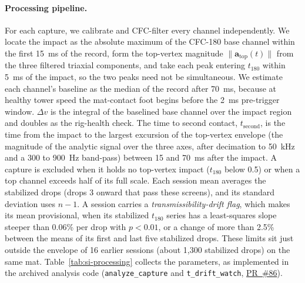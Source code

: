 \documentclass[11pt]{article}
\newcommand{\repo}{https://github.com/vertical-cloud-lab/tensegrity-optimization}
\begin{document}
\paragraph{Processing pipeline.} For each capture, we calibrate and
CFC-filter every channel independently. We locate the impact as the
absolute maximum of the CFC-180 base channel within the first
\SI{15}{ms} of the record, form the top-vertex magnitude
$\lVert\mathbf{a}_{\mathrm{top}}(t)\rVert$ from the three filtered
triaxial components, and take each peak entering $t_{180}$ within
\SI{5}{ms} of the impact, so the two peaks need not be simultaneous. We
estimate each channel's baseline as the median of the record after
\SI{70}{ms}, because at healthy tower speed the mat-contact foot begins
before the \SI{2}{ms} pre-trigger window. $\Delta v$ is the integral of
the baselined base channel over the impact region and doubles as the
rig-health check. The time to second contact, $t_{\mathrm{second}}$, is
the time from the impact to the largest excursion of the top-vertex
envelope (the magnitude of the analytic signal over the three axes,
after decimation to \SI{50}{kHz} and a 300 to \SI{900}{Hz} band-pass)
between 15 and \SI{70}{ms} after the impact. A capture is excluded when it
holds no top-vertex impact ($t_{180}$ below 0.5) or when a top channel
exceeds half of its full scale. Each session mean averages the
stabilized drops (drops 3 onward that pass these screens), and its
standard deviation uses $n-1$. A session carries a
\emph{transmissibility-drift flag}, which makes its mean provisional,
when its stabilized $t_{180}$ series has a least-squares slope steeper
than 0.06\% per drop with $p < 0.01$, or a change of more than 2.5\%
between the means of its first and last five stabilized drops. These
limits sit just outside the envelope of 16 earlier sessions (about 1,300
stabilized drops) on the same mat. Table~\ref{tab:si-processing}
collects the parameters, as implemented in the archived analysis code
(\texttt{analyze\_capture} and \texttt{t\_drift\_watch},
\href{\repo/pull/86}{PR~\#86}).
\end{document}
